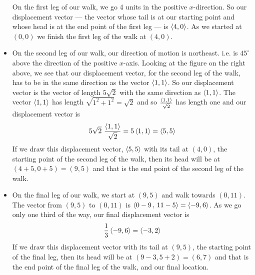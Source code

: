 \begin{eg}
\begin{itemize}
On the first leg of our walk, we go 4 units in the positive $x$-direction.
So our displacement vector --- the vector whose tail is at our starting point and whose head is at the end point of the first leg --- is $\left< 4,0\right>$. 
As we started at $(0,0)$ we finish the first leg of the walk at $(4,0)$.
\item
On the second leg of our walk, our direction of motion is northeast. i.e. is
$45^\circ$ above the direction of the positive $x$-axis. Looking at the figure 
on the right above, we see that our displacement vector, for the second leg of the walk, has to be in the same direction as the vector $\left< 1,1\right>$.
So our displacement vector is the vector of length $5\sqrt{2}$ with the same direction as $\left< 1,1\right>$. The vector $\left< 1,1\right>$ has length
$\sqrt{1^2+1^2}=\sqrt{2}$ and so $\frac{\left< 1,1\right>}{\sqrt{2}}$ has length one
and our displacement vector is
\begin{equation*}
5\sqrt{2}\ \frac{\left< 1,1\right>}{\sqrt{2}}
=5 \left< 1,1\right> 
=\left< 5,5\right>
\end{equation*}
If we draw this displacement vector, $\left< 5,5\right>$ with its tail at 
$(4,0)$, the starting point of the second leg of the walk, then its head 
will be at $(4+5, 0+5)=(9,5)$ and that is the end point of the second 
leg of the walk.
\item
On the final leg of our walk, we start at $(9,5)$ and walk towards $(0,11)$.
The vector from $(9,5)$ to $(0,11)$ is $\left< 0-9\,,\,11-5\right> =\left< -9,6\right>$.
As we go only one third of the way, our final displacement vector is
\begin{equation*}
\frac{1}{3}\left< -9,6\right>
=\left< -3,2\right>
\end{equation*}
If we draw this displacement vector with its tail at 
$(9,5)$, the starting point of the final leg, then its head 
will be at $(9-3, 5+2)=(6,7)$ and that is the end point of the final
leg of the walk, and our final location.
\end{itemize}
\end{eg}


